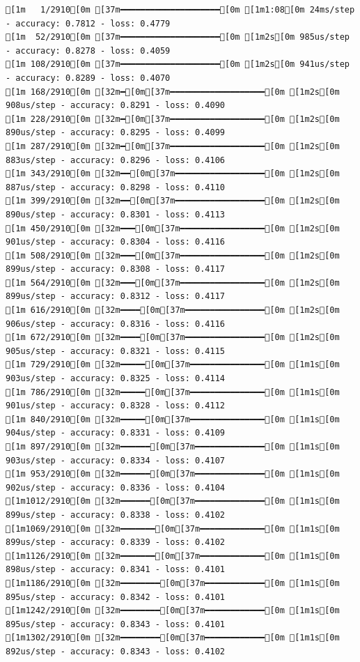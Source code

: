 \documentclass[
  letterpaper,
  DIV=11,
  numbers=noendperiod]{scrartcl}
\begin{document}
\begin{verbatim}
[1m   1/2910[0m [37m━━━━━━━━━━━━━━━━━━━━[0m [1m1:08[0m 24ms/step - accuracy: 0.7812 - loss: 0.4779
[1m  52/2910[0m [37m━━━━━━━━━━━━━━━━━━━━[0m [1m2s[0m 985us/step - accuracy: 0.8278 - loss: 0.4059 
[1m 108/2910[0m [37m━━━━━━━━━━━━━━━━━━━━[0m [1m2s[0m 941us/step - accuracy: 0.8289 - loss: 0.4070
[1m 168/2910[0m [32m━[0m[37m━━━━━━━━━━━━━━━━━━━[0m [1m2s[0m 908us/step - accuracy: 0.8291 - loss: 0.4090
[1m 228/2910[0m [32m━[0m[37m━━━━━━━━━━━━━━━━━━━[0m [1m2s[0m 890us/step - accuracy: 0.8295 - loss: 0.4099
[1m 287/2910[0m [32m━[0m[37m━━━━━━━━━━━━━━━━━━━[0m [1m2s[0m 883us/step - accuracy: 0.8296 - loss: 0.4106
[1m 343/2910[0m [32m━━[0m[37m━━━━━━━━━━━━━━━━━━[0m [1m2s[0m 887us/step - accuracy: 0.8298 - loss: 0.4110
[1m 399/2910[0m [32m━━[0m[37m━━━━━━━━━━━━━━━━━━[0m [1m2s[0m 890us/step - accuracy: 0.8301 - loss: 0.4113
[1m 450/2910[0m [32m━━━[0m[37m━━━━━━━━━━━━━━━━━[0m [1m2s[0m 901us/step - accuracy: 0.8304 - loss: 0.4116
[1m 508/2910[0m [32m━━━[0m[37m━━━━━━━━━━━━━━━━━[0m [1m2s[0m 899us/step - accuracy: 0.8308 - loss: 0.4117
[1m 564/2910[0m [32m━━━[0m[37m━━━━━━━━━━━━━━━━━[0m [1m2s[0m 899us/step - accuracy: 0.8312 - loss: 0.4117
[1m 616/2910[0m [32m━━━━[0m[37m━━━━━━━━━━━━━━━━[0m [1m2s[0m 906us/step - accuracy: 0.8316 - loss: 0.4116
[1m 672/2910[0m [32m━━━━[0m[37m━━━━━━━━━━━━━━━━[0m [1m2s[0m 905us/step - accuracy: 0.8321 - loss: 0.4115
[1m 729/2910[0m [32m━━━━━[0m[37m━━━━━━━━━━━━━━━[0m [1m1s[0m 903us/step - accuracy: 0.8325 - loss: 0.4114
[1m 786/2910[0m [32m━━━━━[0m[37m━━━━━━━━━━━━━━━[0m [1m1s[0m 901us/step - accuracy: 0.8328 - loss: 0.4112
[1m 840/2910[0m [32m━━━━━[0m[37m━━━━━━━━━━━━━━━[0m [1m1s[0m 904us/step - accuracy: 0.8331 - loss: 0.4109
[1m 897/2910[0m [32m━━━━━━[0m[37m━━━━━━━━━━━━━━[0m [1m1s[0m 903us/step - accuracy: 0.8334 - loss: 0.4107
[1m 953/2910[0m [32m━━━━━━[0m[37m━━━━━━━━━━━━━━[0m [1m1s[0m 902us/step - accuracy: 0.8336 - loss: 0.4104
[1m1012/2910[0m [32m━━━━━━[0m[37m━━━━━━━━━━━━━━[0m [1m1s[0m 899us/step - accuracy: 0.8338 - loss: 0.4102
[1m1069/2910[0m [32m━━━━━━━[0m[37m━━━━━━━━━━━━━[0m [1m1s[0m 899us/step - accuracy: 0.8339 - loss: 0.4102
[1m1126/2910[0m [32m━━━━━━━[0m[37m━━━━━━━━━━━━━[0m [1m1s[0m 898us/step - accuracy: 0.8341 - loss: 0.4101
[1m1186/2910[0m [32m━━━━━━━━[0m[37m━━━━━━━━━━━━[0m [1m1s[0m 895us/step - accuracy: 0.8342 - loss: 0.4101
[1m1242/2910[0m [32m━━━━━━━━[0m[37m━━━━━━━━━━━━[0m [1m1s[0m 895us/step - accuracy: 0.8343 - loss: 0.4101
[1m1302/2910[0m [32m━━━━━━━━[0m[37m━━━━━━━━━━━━[0m [1m1s[0m 892us/step - accuracy: 0.8343 - loss: 0.4102

\end{verbatim}
\end{document}
